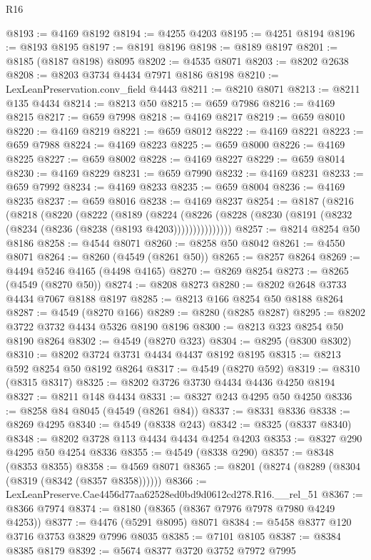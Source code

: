\begin{lexlean}{R16}
\begin{coremodule}
@8193 := @4169 @8192
@8194 := @4255 @4203
@8195 := @4251 @8194
@8196 := @8193 @8195
@8197 := @8191 @8196
@8198 := @8189 @8197
@8201 := @8185 (@8187 @8198) @8095
@8202 := @4535 @8071
@8203 := @8202 @2638
@8208 := @8203 @3734 @4434 @7971 @8186 @8198
@8210 := LexLeanPreservation.conv_field @4443
@8211 := @8210 @8071
@8213 := @8211 @135 @4434
@8214 := @8213 @50
@8215 := @659 @7986
@8216 := @4169 @8215
@8217 := @659 @7998
@8218 := @4169 @8217
@8219 := @659 @8010
@8220 := @4169 @8219
@8221 := @659 @8012
@8222 := @4169 @8221
@8223 := @659 @7988
@8224 := @4169 @8223
@8225 := @659 @8000
@8226 := @4169 @8225
@8227 := @659 @8002
@8228 := @4169 @8227
@8229 := @659 @8014
@8230 := @4169 @8229
@8231 := @659 @7990
@8232 := @4169 @8231
@8233 := @659 @7992
@8234 := @4169 @8233
@8235 := @659 @8004
@8236 := @4169 @8235
@8237 := @659 @8016
@8238 := @4169 @8237
@8254 := @8187
    (@8216
      (@8218
        (@8220
          (@8222
            (@8189
              (@8224
                (@8226 (@8228 (@8230 (@8191 (@8232 (@8234 (@8236 (@8238 (@8193 @4203)))))))))))))))
@8257 := @8214 @8254 @50 @8186
@8258 := @4544 @8071
@8260 := @8258 @50 @8042
@8261 := @4550 @8071
@8264 := @8260 (@4549 (@8261 @50))
@8265 := @8257 @8264
@8269 := @4494 @5246 @4165 (@4498 @4165)
@8270 := @8269 @8254
@8273 := @8265 (@4549 (@8270 @50))
@8274 := @8208 @8273
@8280 := @8202 @2648 @3733 @4434 @7067 @8188 @8197
@8285 := @8213 @166 @8254 @50 @8188 @8264
@8287 := @4549 (@8270 @166)
@8289 := @8280 (@8285 @8287)
@8295 := @8202 @3722 @3732 @4434 @5326 @8190 @8196
@8300 := @8213 @323 @8254 @50 @8190 @8264
@8302 := @4549 (@8270 @323)
@8304 := @8295 (@8300 @8302)
@8310 := @8202 @3724 @3731 @4434 @4437 @8192 @8195
@8315 := @8213 @592 @8254 @50 @8192 @8264
@8317 := @4549 (@8270 @592)
@8319 := @8310 (@8315 @8317)
@8325 := @8202 @3726 @3730 @4434 @4436 @4250 @8194
@8327 := @8211 @148 @4434
@8331 := @8327 @243 @4295 @50 @4250
@8336 := @8258 @84 @8045 (@4549 (@8261 @84))
@8337 := @8331 @8336
@8338 := @8269 @4295
@8340 := @4549 (@8338 @243)
@8342 := @8325 (@8337 @8340)
@8348 := @8202 @3728 @113 @4434 @4434 @4254 @4203
@8353 := @8327 @290 @4295 @50 @4254 @8336
@8355 := @4549 (@8338 @290)
@8357 := @8348 (@8353 @8355)
@8358 := @4569 @8071
@8365 := @8201 (@8274 (@8289 (@8304 (@8319 (@8342 (@8357 @8358))))))
@8366 := LexLeanPreserve.Cae4456d77aa62528ed0bd9d0612cd278.R16.__rel_51
@8367 := @8366 @7974
@8374 := @8180 (@8365 (@8367 @7976 @7978 @7980 @4249 @4253))
@8377 := @4476 (@5291 @8095) @8071
@8384 := @5458 @8377 @120 @3716 @3753 @3829 @7996 @8035
@8385 := @7101 @8105
@8387 := @8384 @8385 @8179
@8392 := @5674 @8377 @3720 @3752 @7972 @7995

\end{coremodule}
\end{lexlean}
